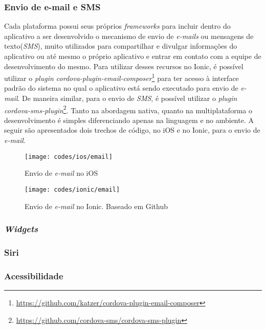 \subsubsection{Envio de e-mail e SMS} \label{subsubsec:emailsms}
Cada plataforma possui seus próprios \textit{frameworks} para incluir dentro do aplicativo a ser desenvolvido o mecanismo de envio de \textit{e-mails} ou mensagens de texto(\textit{SMS}), muito utilizados para compartilhar 
e divulgar informações do aplicativo ou até mesmo o próprio aplicativo e entrar em contato com a equipe de desenvolvimento do mesmo. Para utilizar desses recursos no Ionic, é possível utilizar o 
\textit{plugin cordova-plugin-email-composer}\footnote{\url{https://github.com/katzer/cordova-plugin-email-composer}} para ter acesso à interface padrão do sistema no qual o aplicativo está sendo executado para envio de 
\textit{e-mail}. De maneira similar, para o envio de \textit{SMS}, é possível utilizar o \textit{plugin cordova-sms-plugin}\footnote{\url{https://github.com/cordova-sms/cordova-sms-plugin}}. Tanto na abordagem nativa, 
quanto na multiplataforma o desenvolvimento é simples diferenciando apenas na linguagem e no ambiente. A seguir são apresentados dois trechos de código, no iOS e no Ionic, para o envio de \textit{e-mail}.
\begin{figure}[H]
	\centering
	\texttt{[image: codes/ios/email]}
	\caption[Envio de \textit{e-mail} no iOS]{Envio de \textit{e-mail} no iOS}
	\label{fig:email-ios}
\end{figure}
\begin{figure}[H]
	\centering
	\texttt{[image: codes/ionic/email]}
	\caption[Envio de \textit{e-mail} no Ionic]{Envio de \textit{e-mail} no Ionic. Baseado em Github\protect\footnotemark}
	\label{fig:email-ionic}
\end{figure}

\subsubsection{\textit{Widgets}} \label{subsubsec:widgets}

\subsubsection{Siri} \label{subsubsec:siri}

\subsubsection{Acessibilidade} \label{subsubsec:acessibilidade}

